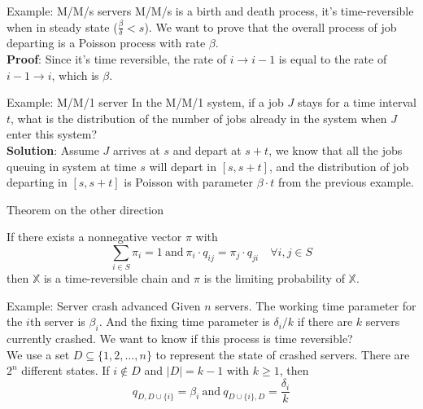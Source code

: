 \documentclass[mathserif]{beamer}
\begin{document}
\begin{frame}{Example: M/M/s servers}
M/M/s is a birth and death process, it's time-reversible when in steady state ($\frac{\beta}{\delta} < s$).
We want to prove that the overall process of job departing is a Poisson process with rate $\beta$.\\
\vspace{\baselineskip}
\textbf{Proof}: Since it's time reversible, the rate of $i\to i-1$ is equal to the rate of $i-1\to i$, which is $\beta$.
\end{frame}

\begin{frame}{Example: M/M/1 server}
In the M/M/1 system, if a job $J$ stays for a time interval $t$, what is the distribution of the number of jobs already in the system when $J$ enter this system?\\
\vspace{\baselineskip}
\textbf{Solution}: Assume $J$ arrives at $s$ and depart at $s+t$, we know that all the jobs queuing in system at time $s$ will depart in $[s,s+t]$, and the distribution of job departing in $[s,s+t]$ is Poisson with parameter $\beta\cdot t$ from the previous example.
\end{frame}

\begin{frame}{Theorem on the other direction}
\begin{theorem}
If there exists a nonnegative vector $\pi$ with 
\[
\sum_{i\in S} \pi_i = 1 ~\text{and}~ \pi_i\cdot q_{ij} = \pi_j\cdot q_{ji}\quad\forall i,j\in S
\]
then $\mathbb{X}$ is a time-reversible chain and $\pi$ is the limiting probability of $\mathbb{X}$.
\end{theorem}
\end{frame}

\begin{frame}{Example: Server crash advanced}
Given $n$ servers. The working time parameter for the $i$th server is $\beta_i$.
And the fixing time parameter is $\delta_i / k$ if there are $k$ servers currently crashed.
We want to know if this process is time reversible?\\
\vspace{\baselineskip}
We use a set $D\subseteq \{1,2,\ldots,n\}$ to represent the state of crashed servers.
There are $2^n$ different states.
If $i\notin D$ and $|D| = k-1$ with $k\geq 1$, then
\[
q_{D,D\cup\{i\}} = \beta_i ~\text{and}~ q_{D\cup\{i\},D} = \frac{\delta_i}{k}
\]
\end{frame}
\end{document}
